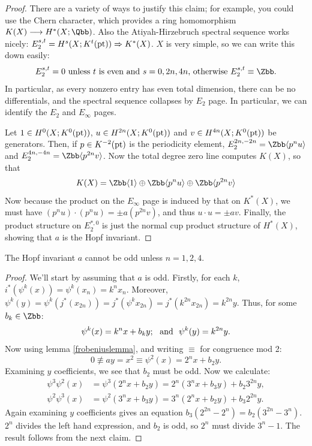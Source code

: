 \begin{proof}
There are a variety of ways to justify this claim; for example, you could use the Chern character, which provides a ring homomorphism $K(X) \to H^*(X; \Qbb)$.  Also the Atiyah-Hirzebruch spectral sequence works nicely: $E_2^{s, t} = H^s(X; K^t(\mathrm{pt})) \Rightarrow K^*(X)$.  $X$ is very simple, so we can write this down easily:
\[E_2^{s,t}=0\text{ unless $t$ is even and $s=0,2n,4n$, otherwise $E_2^{s,t}\equiv\Zbb$.}\]
In particular, as every nonzero entry has even total dimension, there can be no differentials, and the spectral sequence collapses by $E_2$ page. In particular, we can identify the $E_2$ and $E_\infty$ pages.

Let $1\in H^{0}(X;K^0(\mathrm{pt}))$, $u\in H^{2n}(X;K^0(\mathrm{pt}))$ and $v\in H^{4n}(X;K^0(\mathrm{pt}))$ be generators. Then, if $p\in K^{-2}(\mathrm{pt})$ is the periodicity element, $E_2^{2n,-2n}=\Zbb\langle p^nu\rangle$ and $E_2^{4n,-4n}=\Zbb\langle p^{2n}v\rangle$.
Now the total degree zero line computes $K(X)$, so that
\[K(X)=
\Zbb\langle1\rangle\oplus
\Zbb\langle p^nu\rangle\oplus
\Zbb\langle p^{2n}v\rangle\]
Now because the product on the $E_\infty$ page is induced by that on $K^*(X)$, we must have $(p^nu)\cdot(p^nu)=\pm a(p^{2n}v)$, and thus $u\cdot u=\pm av$. Finally, the product structure on $E_2^{*,0}$ is just the normal cup product structure of $H^*(X)$, showing that $a$ is the Hopf invariant.
%
\end{proof}
\begin{thm}
The Hopf invariant $a$ cannot be odd unless $n = 1, 2, 4$.
\end{thm}
\begin{proof}
We'll start by assuming that $a$ is odd.
Firstly, for each $k$, $i^*(\psi^k(x))=\psi^k(x_n)=k^nx_n$. Moreover, $\psi^k(y)=\psi^k(j^*(x_{2n}))=j^*(\psi^kx_{2n})
=j^*(k^{2n}x_{2n})=k^{2n}y$. Thus, for some $b_k\in\Zbb$:
\[\psi^k(x)=k^nx+b_ky;\textup{ \ and \ }\psi^k(y)=k^{2n}y.\]
Now using lemma \ref{frobeniuslemma}, and writing $\equiv$ for congruence mod 2:
\[0\not\equiv ay=x^2\equiv\psi^2(x)=2^nx+b_2y.\]
Examining $y$ coefficients, we see that $b_2$ must be odd. Now we calculate:
\begin{align*}
\psi^3 \psi^2(x) & = \psi^3(2^n x + b_2 y) = 2^n(3^n x + b_3 y) + b_2 3^{2n} y, \\
\psi^2 \psi^3(x) & = \psi^2(3^n x + b_3 y) = 3^n(2^n x + b_2 y) + b_3 2^{2n} y.
\end{align*}
Again examining $y$ coefficients gives an equation $b_3(2^{2n} - 2^n) = b_2(3^{2n} - 3^n)$.  $2^n$ divides the left hand expression, and $b_2$ is odd, so $2^n$ must divide $3^n - 1$. The result follows from the next claim.
\end{proof}
